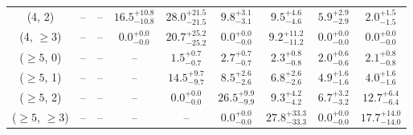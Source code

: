 \begin{table}[h!]
{\begin{tabular}{ccccccccc}
	(4, 2) & -- & -- & $16.5^{+ 10.8 }_{- 10.8 }$ & $28.0^{+ 21.5 }_{- 21.5 }$ & $9.8^{+ 3.1 }_{- 3.1 }$ & $9.5^{+ 4.6 }_{- 4.6 }$ & $5.9^{+ 2.9 }_{- 2.9 }$ & $2.0^{+ 1.5 }_{- 1.5 }$ \\[0.5ex] 
	(4, $\ge3$) & -- & -- & $0.0^{+ 0.0 }_{- 0.0 }$ & $20.7^{+ 25.2 }_{- 25.2 }$ & $0.0^{+ 0.0 }_{- 0.0 }$ & $9.2^{+ 11.2 }_{- 11.2 }$ & $0.0^{+ 0.0 }_{- 0.0 }$ & $0.0^{+ 0.0 }_{- 0.0 }$ \\[0.5ex] 
	($\ge5$, 0) & -- & -- & -- & $1.5^{+ 0.7 }_{- 0.7 }$ & $2.7^{+ 0.7 }_{- 0.7 }$ & $2.3^{+ 0.8 }_{- 0.8 }$ & $2.0^{+ 0.6 }_{- 0.6 }$ & $2.1^{+ 0.8 }_{- 0.8 }$ \\[0.5ex] 
	($\ge5$, 1) & -- & -- & -- & $14.5^{+ 9.7 }_{- 9.7 }$ & $8.5^{+ 2.6 }_{- 2.6 }$ & $6.8^{+ 2.6 }_{- 2.6 }$ & $4.9^{+ 1.6 }_{- 1.6 }$ & $4.0^{+ 1.6 }_{- 1.6 }$ \\[0.5ex] 
	($\ge5$, 2) & -- & -- & -- & $0.0^{+ 0.0 }_{- 0.0 }$ & $26.5^{+ 9.9 }_{- 9.9 }$ & $9.3^{+ 4.2 }_{- 4.2 }$ & $6.7^{+ 3.2 }_{- 3.2 }$ & $12.7^{+ 6.4 }_{- 6.4 }$ \\[0.5ex] 
	($\ge5$, $\ge3$) & -- & -- & -- & -- & $0.0^{+ 0.0 }_{- 0.0 }$ & $27.8^{+ 33.3 }_{- 33.3 }$ & $0.0^{+ 0.0 }_{- 0.0 }$ & $17.7^{+ 14.0 }_{- 14.0 }$ \\[0.5ex] 
	\hline
	\hline
\end{tabular}}
\end{table}

